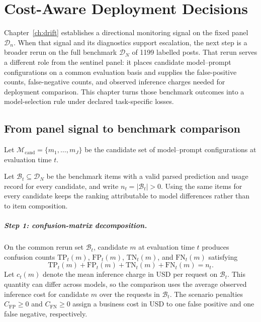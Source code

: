 \chapter{Cost-Aware Deployment Decisions}
\label{ch:cost-deployment-utility}

\noindent Chapter~\ref{ch:drift} establishes a directional monitoring signal on the fixed panel \(\mathcal{D}_n\). When that signal and its diagnostics support escalation, the next step is a broader rerun on the full benchmark \(\mathcal{D}_N\) of 1199 labelled posts. That rerun serves a different role from the sentinel panel: it places candidate model--prompt configurations on a common evaluation basis and supplies the false-positive counts, false-negative counts, and observed inference charges needed for deployment comparison. This chapter turns those benchmark outcomes into a model-selection rule under declared task-specific losses.

\section{From panel signal to benchmark comparison}

Let
\(\mathcal{M}_{\mathrm{cand}}=\{m_1,\ldots,m_J\}\) be the candidate set of model--prompt configurations at evaluation time \(t\).

Let \(\mathcal{B}_t\subseteq\mathcal{D}_N\) be the benchmark items with a valid parsed prediction and usage record for every candidate, and write \(n_t=|\mathcal{B}_t|>0\). Using the same items for every candidate keeps the ranking attributable to model differences rather than to item composition.

\paragraph{Step 1: confusion-matrix decomposition.}
On the common rerun set \(\mathcal{B}_t\), candidate \(m\) at evaluation time \(t\) produces confusion counts \(\mathrm{TP}_t(m)\), \(\mathrm{FP}_t(m)\), \(\mathrm{TN}_t(m)\), and \(\mathrm{FN}_t(m)\) satisfying
\[
    \mathrm{TP}_t(m)
    +\mathrm{FP}_t(m)
    +\mathrm{TN}_t(m)
    +\mathrm{FN}_t(m)
    =
    n_t.
\]
Let \(c_t(m)\) denote the mean inference charge in USD per request on \(\mathcal{B}_t\). This quantity can differ across models, so the comparison uses the average observed inference cost for candidate \(m\) over the requests in \(\mathcal{B}_t\). The scenario penalties \(C_{\mathrm{FP}}\ge0\) and \(C_{\mathrm{FN}}\ge0\) assign a business cost in USD to one false positive and one false negative, respectively.

